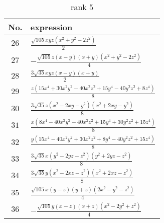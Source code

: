\documentclass[fleqn,8pt,landscape]{jsarticle}
\begin{document}
\begin{table}[ht!]
\begin{center}
\caption{rank 5}
\renewcommand{\arraystretch}{1.3}
\begin{tabular}{cl} \hline \hline
No. & expression \\ \hline
$ 26 $ & $ \frac{\sqrt{105} x y z \left(x^{2} + y^{2} - 2 z^{2}\right)}{2} $ \\
$ 27 $ & $ - \frac{\sqrt{105} z \left(x - y\right) \left(x + y\right) \left(x^{2} + y^{2} - 2 z^{2}\right)}{4} $ \\
$ 28 $ & $ \frac{3 \sqrt{35} x y z \left(x - y\right) \left(x + y\right)}{2} $ \\
$ 29 $ & $ \frac{z \left(15 x^{4} + 30 x^{2} y^{2} - 40 x^{2} z^{2} + 15 y^{4} - 40 y^{2} z^{2} + 8 z^{4}\right)}{8} $ \\
$ 30 $ & $ \frac{3 \sqrt{35} z \left(x^{2} - 2 x y - y^{2}\right) \left(x^{2} + 2 x y - y^{2}\right)}{8} $ \\
$ 31 $ & $ \frac{x \left(8 x^{4} - 40 x^{2} y^{2} - 40 x^{2} z^{2} + 15 y^{4} + 30 y^{2} z^{2} + 15 z^{4}\right)}{8} $ \\
$ 32 $ & $ \frac{y \left(15 x^{4} - 40 x^{2} y^{2} + 30 x^{2} z^{2} + 8 y^{4} - 40 y^{2} z^{2} + 15 z^{4}\right)}{8} $ \\
$ 33 $ & $ \frac{3 \sqrt{35} x \left(y^{2} - 2 y z - z^{2}\right) \left(y^{2} + 2 y z - z^{2}\right)}{8} $ \\
$ 34 $ & $ \frac{3 \sqrt{35} y \left(x^{2} - 2 x z - z^{2}\right) \left(x^{2} + 2 x z - z^{2}\right)}{8} $ \\
$ 35 $ & $ \frac{\sqrt{105} x \left(y - z\right) \left(y + z\right) \left(2 x^{2} - y^{2} - z^{2}\right)}{4} $ \\
$ 36 $ & $ - \frac{\sqrt{105} y \left(x - z\right) \left(x + z\right) \left(x^{2} - 2 y^{2} + z^{2}\right)}{4} $ \\
 \hline \hline
\end{tabular}
\end{center}
\end{table}
\end{document}
